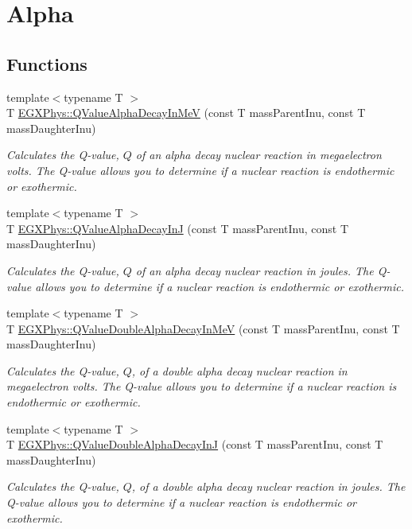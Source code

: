\hypertarget{group___e_g_x_phys-_q_value-_alpha}{}\section{Alpha}
\label{group___e_g_x_phys-_q_value-_alpha}
\subsection*{Functions}
\begin{DoxyCompactItemize}
\item 
{\footnotesize template$<$typename T $>$ }\\T \mbox{\hyperlink{group___e_g_x_phys-_q_value-_alpha_ga4f9a38d3ad4bf93471a0affb493b6e72}{E\+G\+X\+Phys\+::\+Q\+Value\+Alpha\+Decay\+In\+MeV}} (const T mass\+Parent\+Inu, const T mass\+Daughter\+Inu)
\begin{DoxyCompactList}\small\item\em Calculates the Q-\/value, $Q$ of an alpha decay nuclear reaction in megaelectron volts. The Q-\/value allows you to determine if a nuclear reaction is endothermic or exothermic. \end{DoxyCompactList}\item 
{\footnotesize template$<$typename T $>$ }\\T \mbox{\hyperlink{group___e_g_x_phys-_q_value-_alpha_gab8a50c18f6de3c1b6ed280c26c3ff3a5}{E\+G\+X\+Phys\+::\+Q\+Value\+Alpha\+Decay\+InJ}} (const T mass\+Parent\+Inu, const T mass\+Daughter\+Inu)
\begin{DoxyCompactList}\small\item\em Calculates the Q-\/value, $Q$ of an alpha decay nuclear reaction in joules. The Q-\/value allows you to determine if a nuclear reaction is endothermic or exothermic. \end{DoxyCompactList}\item 
{\footnotesize template$<$typename T $>$ }\\T \mbox{\hyperlink{group___e_g_x_phys-_q_value-_alpha_ga85230c793adc7fc78fef760874f75ad9}{E\+G\+X\+Phys\+::\+Q\+Value\+Double\+Alpha\+Decay\+In\+MeV}} (const T mass\+Parent\+Inu, const T mass\+Daughter\+Inu)
\begin{DoxyCompactList}\small\item\em Calculates the Q-\/value, $Q$, of a double alpha decay nuclear reaction in megaelectron volts. The Q-\/value allows you to determine if a nuclear reaction is endothermic or exothermic. \end{DoxyCompactList}\item 
{\footnotesize template$<$typename T $>$ }\\T \mbox{\hyperlink{group___e_g_x_phys-_q_value-_alpha_ga015ade04346d0c6dae4dda8e3aab8cbd}{E\+G\+X\+Phys\+::\+Q\+Value\+Double\+Alpha\+Decay\+InJ}} (const T mass\+Parent\+Inu, const T mass\+Daughter\+Inu)
\begin{DoxyCompactList}\small\item\em Calculates the Q-\/value, $Q$, of a double alpha decay nuclear reaction in joules. The Q-\/value allows you to determine if a nuclear reaction is endothermic or exothermic. \end{DoxyCompactList}\end{DoxyCompactItemize}


